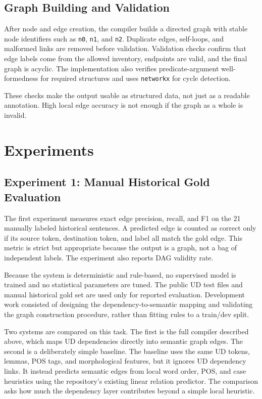 \documentclass[11pt]{article}
\begin{document}
\subsection{Graph Building and Validation}
After node and edge creation, the compiler builds a directed graph with stable
node identifiers such as \texttt{n0}, \texttt{n1}, and \texttt{n2}. Duplicate
edges, self-loops, and malformed links are removed before validation. Validation
checks confirm that edge labels come from the allowed inventory, endpoints are
valid, and the final graph is acyclic. The implementation also verifies
predicate-argument well-formedness for required structures and uses
\texttt{networkx} for cycle detection.

These checks make the output usable as structured data, not just as a readable
annotation. High local edge accuracy is not enough if the graph as a whole is
invalid.

\section{Experiments}
\subsection{Experiment 1: Manual Historical Gold Evaluation}
The first experiment measures exact edge precision, recall, and F1 on the 21
manually labeled historical sentences. A predicted edge is counted as correct
only if its source token, destination token, and label all match the gold edge.
This metric is strict but appropriate because the output is a graph, not a bag of
independent labels. The experiment also reports DAG validity rate.

Because the system is deterministic and rule-based, no supervised model is
trained and no statistical parameters are tuned. The public UD test files and
manual historical gold set are used only for reported evaluation. Development
work consisted of designing the dependency-to-semantic mapping and validating
the graph construction procedure, rather than fitting rules to a train/dev split.

Two systems are compared on this task. The first is the full compiler described
above, which maps UD dependencies directly into semantic graph edges. The second
is a deliberately simple baseline. The baseline uses the same UD tokens, lemmas,
POS tags, and morphological features, but it ignores UD dependency links. It
instead predicts semantic edges from local word order, POS, and case heuristics
using the repository's existing linear relation predictor. The comparison asks
how much the dependency layer contributes beyond a simple local heuristic.
\end{document}
